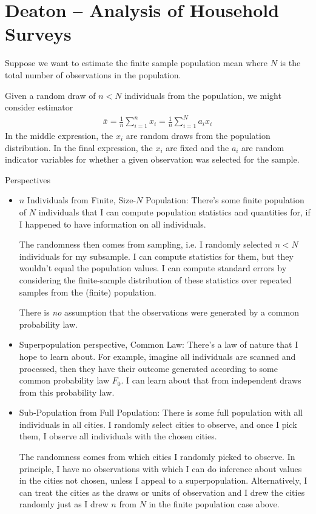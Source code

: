 \documentclass[12pt]{article}
\theoremstyle{plain}
\theoremstyle{definition}
\theoremstyle{remark}
\newcommand{\sumin}{\sum^n_{i=1}}
\newcommand{\sumiN}{\sum^N_{i=1}}
\begin{document}
\clearpage
\section{Deaton -- Analysis of Household Surveys}


Suppose we want to estimate the finite sample population mean where $N$
is the total number of observations in the population.

Given a random draw of $n<N$ individuals from the population, we might
consider estimator
\begin{align*}
  \bar{x}
  =
  \frac{1}{n}
  \sumin
  x_i
  =
  \frac{1}{n}
  \sumiN
  a_i
  x_i
\end{align*}
In the middle expression, the $x_i$ are random draws from the population
distribution. In the final expression, the $x_i$ are fixed and the $a_i$
are random indicator variables for whether a given observation was
selected for the sample.

Perspectives
\begin{itemize}
  \item $n$ Individuals from Finite, Size-$N$ Population:
    There's some finite population of $N$ individuals that I can compute
    population statistics and quantities for, if I happened to have
    information on all individuals.

    The randomness then comes from sampling, i.e. I randomly selected
    $n<N$ individuals for my subsample.
    I can compute statistics for them, but they wouldn't equal the
    population values. I can compute standard errors by considering the
    finite-sample distribution of these statistics over repeated samples
    from the (finite) population.

    There is \emph{no} assumption that the observations were generated
    by a common probability law.

  \item Superpopulation perspective, Common Law:
    There's a law of nature that I hope to learn about.
    For example, imagine all individuals are scanned and processed,
    then they have their outcome generated according to some common
    probability law $F_0$.
    I can learn about that from independent draws from this probability
    law.

  \item Sub-Population from Full Population:
    There is some full population with all individuals in all cities.
    I randomly select cities to observe, and once I pick them, I observe
    all individuals with the chosen cities.

    The randomness comes from which cities I randomly picked to observe.
    In principle, I have no observations with which I can do inference
    about values in the cities not chosen, unless I appeal to a
    superpopulation.
    Alternatively, I can treat the cities as the draws or units of
    observation and I drew the cities randomly just as I drew $n$ from
    $N$ in the finite population case above.
\end{itemize}
















\clearpage

\nocite{*}

\end{document}
